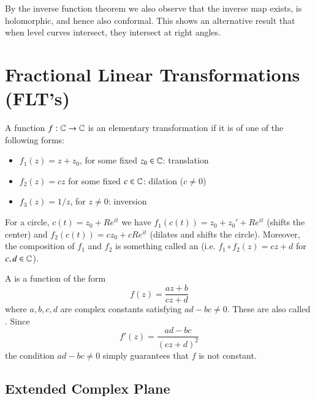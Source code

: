 \documentclass[12pt, a4paper, oneside, openright, titlepage]{book}
\begin{document}
By the inverse function theorem we also observe that the inverse map exists, is holomorphic, and hence also conformal. This shows an alternative result that when level curves intersect, they intersect at right angles.




\section{Fractional Linear Transformations (FLT's)}

\begin{defn}
    A function $f:\mathbb C\rightarrow \mathbb C$ is an elementary transformation if it is of one of the following forms: \begin{itemize}
        \item $f_1(z) = z+z_0$, for some fixed $z_0 \in \mathbb C$: translation
        \item $f_2(z) = cz$ for some fixed $c \in \mathbb C$: dilation ($c\neq 0$)
        \item $f_3(z) = 1/z$, for $z \neq 0$: inversion
    \end{itemize}
\end{defn}

For a circle, $c(t) = z_0+Re^{it}$ we have $f_1(c(t)) = z_0+z_0'+Re^{it}$ (shifts the center) and $f_2(c(t)) = cz_0+cRe^{it}$ (dilates and shifts the circle). Moreover, the composition of $f_1$ and $f_2$ is something called an  (i.e. $f_1\circ f_2(z) = cz+d$ for $c,d \in \mathbb C$).

\begin{defn}
    A  is a function of the form \begin{equation*}
        f(z) = \frac{az+b}{cz+d}
    \end{equation*}
    where $a,b,c,d$ are complex constants satisfying $ad-bc \neq 0$. These are also called . Since \begin{equation*}
        f'(z) = \frac{ad-bc}{(cz+d)^2}
    \end{equation*}
    the condition $ad-bc \neq 0$ simply guarantees that $f$ is not constant.
\end{defn}


\subsection{Extended Complex Plane}
\end{document}
